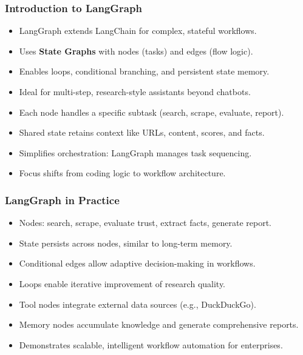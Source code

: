 \begin{frame}[fragile]\frametitle{Introduction to LangGraph}
    \begin{itemize}
        \item LangGraph extends LangChain for complex, stateful workflows.
        \item Uses \textbf{State Graphs} with nodes (tasks) and edges (flow logic).
        \item Enables loops, conditional branching, and persistent state memory.
        \item Ideal for multi-step, research-style assistants beyond chatbots.
        \item Each node handles a specific subtask (search, scrape, evaluate, report).
        \item Shared state retains context like URLs, content, scores, and facts.
        \item Simplifies orchestration: LangGraph manages task sequencing.
        \item Focus shifts from coding logic to workflow architecture.
    \end{itemize}
\end{frame}
\begin{frame}[fragile]\frametitle{LangGraph in Practice}
    \begin{itemize}
        \item Nodes: search, scrape, evaluate trust, extract facts, generate report.
        \item State persists across nodes, similar to long-term memory.
        \item Conditional edges allow adaptive decision-making in workflows.
        \item Loops enable iterative improvement of research quality.
        \item Tool nodes integrate external data sources (e.g., DuckDuckGo).
        \item Memory nodes accumulate knowledge and generate comprehensive reports.
        \item Demonstrates scalable, intelligent workflow automation for enterprises.
    \end{itemize}
\end{frame}
